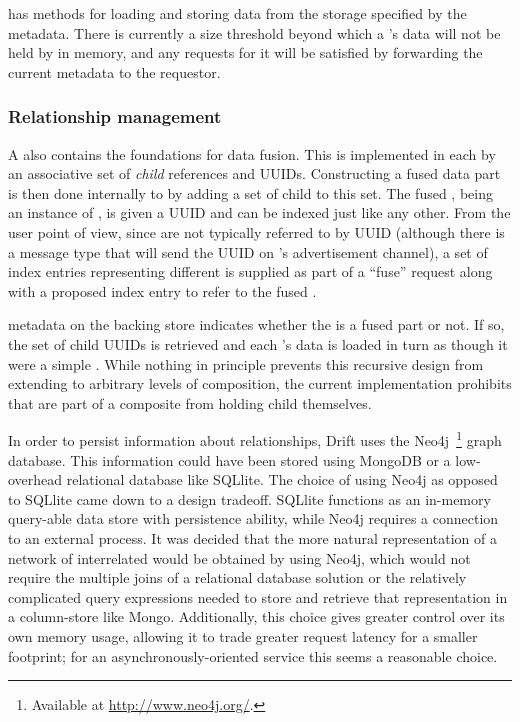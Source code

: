 \partclass has methods for loading and storing data from the storage specified by the metadata.  There is
currently a size threshold beyond which a \dpart's data will not be held by \driftd in memory, and any
requests for it will be satisfied by forwarding the current metadata to the requestor.  

\subsubsection{Relationship management}

A \dpart also contains the foundations for data fusion.  This is implemented in each \partclass by an
associative set of \emph{child} \dpart references and UUIDs.  Constructing a fused data part is then done
internally to \driftd by adding a set of child \dparts to this set.  The fused \dpart, being an instance
of \partclass, is given a UUID and can be indexed just like any other.  From the user point of view,
since \dparts are not typically referred to by UUID (although there is a message type that will send the
UUID on \driftd's advertisement channel), a set of index entries representing different \dparts is
supplied as part of a ``fuse'' request along with a proposed index entry to refer to the fused \dpart.

\dpart metadata on the backing store indicates whether the \dpart is a fused part or not.  If so, the set
of child \dpart UUIDs is retrieved and each \dpart's data is loaded in turn as though it were a simple
\dpart.  While nothing in principle prevents this recursive design from extending to arbitrary levels of
\dpart composition, the current \driftd implementation prohibits \dparts that are part of a composite
from holding child \dparts themselves.

In order to persist information about \dpart relationships, Drift uses the Neo4j~\footnote{Available at
  \url{http://www.neo4j.org/}.} graph database. This information could have been stored using
MongoDB or a low-overhead relational database like SQLlite.  The choice of using Neo4j as opposed to
SQLlite came down to a design tradeoff.  SQLlite functions as an in-memory query-able data store
with persistence ability, while Neo4j requires a connection to an external process.  It was decided that
the more natural representation of a network of interrelated \dparts would be obtained by using Neo4j,
which would not require the multiple joins of a relational database solution or the relatively
complicated query expressions needed to store and retrieve that representation in a column-store like
Mongo.  Additionally, this choice gives \driftd greater control over its own memory usage, allowing it to
trade greater request latency for a smaller footprint; for an asynchronously-oriented service this seems
a reasonable choice.

